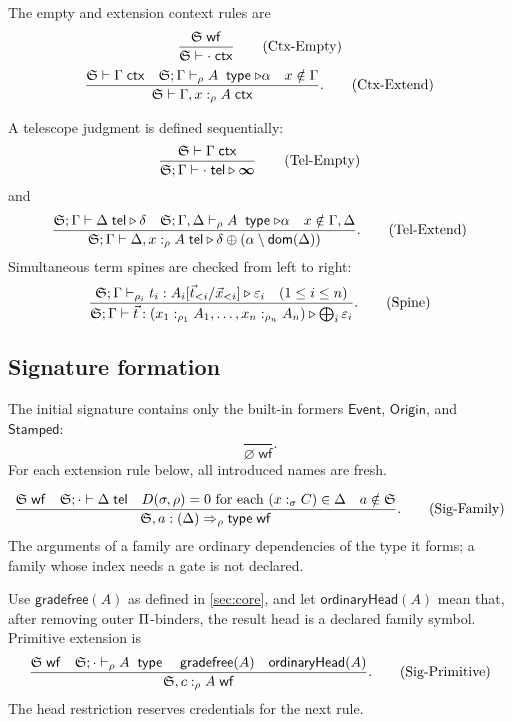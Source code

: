 \documentclass[11pt]{article}
\numberwithin{equation}{section}
\theoremstyle{definition}
\theoremstyle{plain}
\theoremstyle{remark}
\newcommand{\Type}{\mathsf{type}}
\newcommand{\Event}{\mathsf{Event}}
\newcommand{\Origin}{\mathsf{Origin}}
\newcommand{\Stamped}{\mathsf{Stamped}}
\newcommand{\eps}{\varepsilon}
\newcommand{\absent}{\boldsymbol\infty}
\newcommand{\jtype}{\mathrel{\mathsf{type}}}
\newcommand{\ctx}{\mathsf{ctx}}
\newcommand{\wf}{\mathsf{wf}}
\begin{document}
The empty and extension context rules are
\[
\frac{\AFDeclSignature\;\wf}{\AFDeclSignature\vdash\cdot\;\ctx}
\tag{Ctx-Empty}
\]
\[
\frac{
 \AFDeclSignature\vdash\Gamma\;\ctx
 \quad
 \AFDeclSignature;\Gamma\vdash_{\rho} A\;\jtype\triangleright\alpha
 \quad x\notin\Gamma
}{
 \AFDeclSignature\vdash\Gamma,x:_{\rho}A\;\ctx
}.
\tag{Ctx-Extend}
\]

A telescope judgment is defined sequentially:
\[
\frac{\AFDeclSignature\vdash\Gamma\;\ctx}
{\AFDeclSignature;\Gamma\vdash\cdot\;\mathsf{tel}\triangleright\absent}
\tag{Tel-Empty}
\]
and
\[
\frac{
 \AFDeclSignature;\Gamma\vdash\Delta\;\mathsf{tel}\triangleright\delta
 \quad
 \AFDeclSignature;\Gamma,\Delta\vdash_{\rho} A\;\jtype\triangleright\alpha
 \quad x\notin\Gamma,\Delta
}{
 \AFDeclSignature;\Gamma\vdash\Delta,x:_{\rho}A\;\mathsf{tel}
 \triangleright\delta\oplus(\alpha\setminus\mathsf{dom}(\Delta))
}.
\tag{Tel-Extend}
\]
Simultaneous term spines are checked from left to right:
\[
\frac{
 \AFDeclSignature;\Gamma\vdash_{\rho_i} t_i:
 A_i[\vec t_{<i}/\vec x_{<i}]\triangleright\eps_i
 \quad(1\le i\le n)
}{
 \AFDeclSignature;\Gamma\vdash\vec t:
 (x_1:_{\rho_1}A_1,\ldots,x_n:_{\rho_n}A_n)
 \triangleright\bigoplus_i\eps_i
}.
\tag{Spine}
\]

\subsection{Signature formation}

The initial signature contains only the built-in formers
\(\Event\), \(\Origin\), and \(\Stamped\):
\[
  \frac{}{\varnothing\;\wf}.
\tag{Sig-Empty}
\]
For each extension rule below, all introduced names are fresh.

\[
\frac{
 \AFDeclSignature\;\wf
 \quad
 \AFDeclSignature;\cdot\vdash\Delta\;\mathsf{tel}
 \quad D(\sigma,\rho)=0\text{ for each }(x:_\sigma C)\in\Delta
 \quad a\notin\AFDeclSignature
}{
 \AFDeclSignature,a:(\Delta)\Rightarrow_{\rho}\Type\;\wf
}.
\tag{Sig-Family}
\]
The arguments of a family are ordinary dependencies of the type it forms; a
family whose index needs a gate is not declared.

Use \(\mathsf{gradefree}(A)\) as defined in \cref{sec:core}, and let
\(\mathsf{ordinaryHead}(A)\) mean that, after removing outer
\(\Pi\)-binders, the result head is a declared family symbol.  Primitive
extension is
\[
\frac{
 \AFDeclSignature\;\wf
 \quad \AFDeclSignature;\cdot\vdash_{\rho} A\;\jtype
 \quad \mathsf{gradefree}(A)
 \quad \mathsf{ordinaryHead}(A)
}{
 \AFDeclSignature,c:_{\rho}A\;\wf
}.
\tag{Sig-Primitive}
\]
The head restriction reserves credentials for the next rule.
\end{document}
